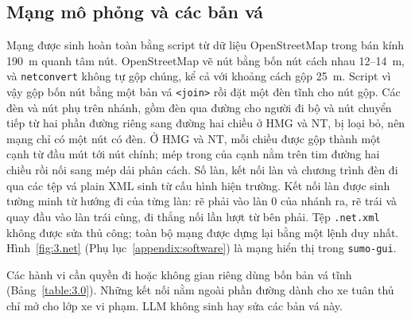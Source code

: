 \documentclass[../main.tex]{subfiles}
\begin{document}
\subsection{Mạng mô phỏng và các bản vá}

Mạng được sinh hoàn toàn bằng script từ dữ liệu OpenStreetMap trong bán kính 190~m quanh tâm nút. OpenStreetMap vẽ nút bằng bốn nút cách nhau 12--14~m, và \texttt{netconvert} không tự gộp chúng, kể cả với khoảng cách gộp 25~m. Script vì vậy gộp bốn nút bằng một bản vá \texttt{<join>} rồi đặt một đèn tĩnh cho nút gộp. Các đèn và nút phụ trên nhánh, gồm đèn qua đường cho người đi bộ và nút chuyển tiếp từ hai phần đường riêng sang đường hai chiều ở HMG và NT, bị loại bỏ, nên mạng chỉ có một nút có đèn. Ở HMG và NT, mỗi chiều được gộp thành một cạnh từ đầu mút tới nút chính; mép trong của cạnh nằm trên tim đường hai chiều rồi nối sang mép dải phân cách. Số làn, kết nối làn và chương trình đèn đi qua các tệp vá plain XML sinh từ cấu hình hiện trường. Kết nối làn được sinh tường minh từ hướng đi của từng làn: rẽ phải vào làn 0 của nhánh ra, rẽ trái và quay đầu vào làn trái cùng, đi thẳng nối lần lượt từ bên phải. Tệp \texttt{.net.xml} không được sửa thủ công; toàn bộ mạng được dựng lại bằng một lệnh duy nhất. Hình~\ref{fig:3.net} (Phụ lục~\ref{appendix:software}) là mạng hiển thị trong \texttt{sumo-gui}.

Các hành vi cần quyền đi hoặc không gian riêng dùng bốn bản vá tĩnh (Bảng~\ref{table:3.0}). Những kết nối nằm ngoài phần đường dành cho xe tuân thủ chỉ mở cho lớp xe vi phạm. LLM không sinh hay sửa các bản vá này.
\end{document}
